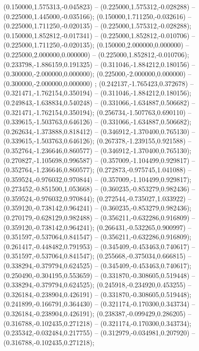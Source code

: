  (0.150000,1.575313,-0.045823) -- (0.225000,1.575312,-0.028288) -- (0.225000,1.445000,-0.035166);
 (0.150000,1.711250,-0.032616) -- (0.225000,1.711250,-0.020135) -- (0.225000,1.575312,-0.028288);
 (0.150000,1.852812,-0.017341) -- (0.225000,1.852812,-0.010706) -- (0.225000,1.711250,-0.020135);
 (0.150000,2.000000,0.000000) -- (0.225000,2.000000,0.000000) -- (0.225000,1.852812,-0.010706);
 (0.233798,-1.886159,0.191325) -- (0.311046,-1.884212,0.180156) -- (0.300000,-2.000000,0.000000);
 (0.225000,-2.000000,0.000000) -- (0.300000,-2.000000,0.000000) ;
 (0.242137,-1.765423,0.372678) -- (0.321471,-1.762154,0.350194) -- (0.311046,-1.884212,0.180156);
 (0.249843,-1.638834,0.540248) -- (0.331066,-1.634887,0.506682) -- (0.321471,-1.762154,0.350194);
 (0.256734,-1.507763,0.690110) -- (0.339615,-1.503763,0.646126) -- (0.331066,-1.634887,0.506682);
 (0.262634,-1.373888,0.818412) -- (0.346912,-1.370400,0.765130) -- (0.339615,-1.503763,0.646126);
 (0.267378,-1.239155,0.921588) -- (0.352764,-1.236646,0.860577) -- (0.346912,-1.370400,0.765130);
 (0.270827,-1.105698,0.996587) -- (0.357009,-1.104499,0.929817) -- (0.352764,-1.236646,0.860577);
 (0.272873,-0.975745,1.041088) -- (0.359524,-0.976032,0.970844) -- (0.357009,-1.104499,0.929817);
 (0.273452,-0.851500,1.053668) -- (0.360235,-0.853279,0.982436) -- (0.359524,-0.976032,0.970844);
 (0.272544,-0.735027,1.033922) -- (0.359120,-0.738142,0.964241) -- (0.360235,-0.853279,0.982436);
 (0.270179,-0.628129,0.982488) -- (0.356211,-0.632286,0.916809) -- (0.359120,-0.738142,0.964241);
 (0.266431,-0.532265,0.900997) -- (0.351597,-0.537064,0.841547) -- (0.356211,-0.632286,0.916809);
 (0.261417,-0.448482,0.791953) -- (0.345409,-0.453463,0.740617) -- (0.351597,-0.537064,0.841547);
 (0.255668,-0.375034,0.666815) -- (0.338294,-0.379794,0.624525) -- (0.345409,-0.453463,0.740617);
 (0.250490,-0.304195,0.553659) -- (0.331870,-0.308605,0.519448) -- (0.338294,-0.379794,0.624525);
 (0.245918,-0.234920,0.453255) -- (0.326184,-0.238904,0.426191) -- (0.331870,-0.308605,0.519448);
 (0.241899,-0.166791,0.364430) -- (0.321174,-0.170300,0.343734) -- (0.326184,-0.238904,0.426191);
 (0.238387,-0.099429,0.286205) -- (0.316788,-0.102435,0.271218) -- (0.321174,-0.170300,0.343734);
 (0.235342,-0.032484,0.217755) -- (0.312979,-0.034981,0.207920) -- (0.316788,-0.102435,0.271218);
